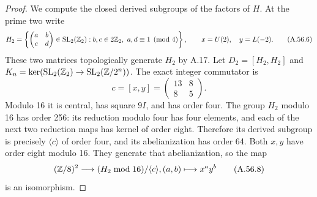 \begin{proof}
We compute the closed derived subgroups of the factors of $H$.
At the prime two write
\[
 H_2=\left\{\begin{pmatrix}a&b\\c&d\end{pmatrix}
   \in\operatorname{SL}_2(\mathbb Z_2):
       b,c\in2\mathbb Z_2,\ a,d\equiv1\pmod4\right\},
 \qquad x=U(2),\quad y=L(-2).
\tag{A.56.6}
\]
These two matrices topologically generate $H_2$ by A.17.
Let $D_2=[H_2,H_2]$ and
$K_n=\ker(\operatorname{SL}_2(\mathbb Z_2)\to
\operatorname{SL}_2(\mathbb Z/2^n))$.  The exact integer commutator is
\[
                c=[x,y]=\begin{pmatrix}13&8\\8&5\end{pmatrix}.
\tag{A.56.7}
\]
Modulo 16 it is central, has square $9I$, and has order four.
The group $H_2$ modulo 16 has order 256: its reduction modulo
four has four elements, and each of the next two reduction
maps has kernel of order eight.  Therefore its derived subgroup
is precisely $\langle c\rangle$ of order four, and its
abelianization has order 64.  Both $x,y$ have order eight
modulo 16.  They generate that abelianization, so the map
\[
         (\mathbb Z/8)^2\longrightarrow
            (H_2\bmod16)/\langle c\rangle,
                         (a,b)\longmapsto x^a y^b
\tag{A.56.8}
\]
is an isomorphism.


\end{proof}
